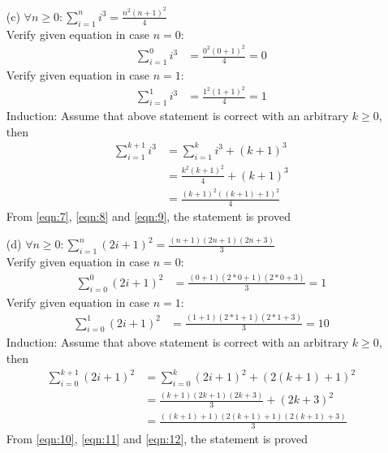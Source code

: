 \begin{enumerate}
    \newpage
    \item[(c)] $\forall n\geq 0: \displaystyle\sum^{n}_{i=1} i^3 = \frac{n^2(n+1)^2}{4}$ \\
        Verify given equation in case $n=0$:
            \begin{align}
                \displaystyle\sum^{0}_{i=1} i^3 &= \frac{0^2(0+1)^2}{4} = 0 \label{eqn:7}
            \end{align}
        Verify given equation in case $n=1$:
            \begin{align}
                \displaystyle\sum^{1}_{i=1} i^3 &= \frac{1^2(1+1)^2}{4} = 1 \label{eqn:8}
            \end{align}
        Induction: Assume that above statement is correct with an arbitrary $k \geq 0$, then\\
        \begin{align}
            \displaystyle\sum^{k+1}_{i=1} i^3 &= \displaystyle\sum^{k}_{i=1} i^3 + (k+1)^3 \\
                                            &= \frac{k^2(k+1)^2}{4} + (k+1)^3 \\
                                            &= \frac{(k+1)^2((k+1)+1)^2}{4} \label{eqn:9}
        \end{align}
        From \ref{eqn:7}, \ref{eqn:8} and \ref{eqn:9}, the statement is proved
    
    \item[(d)] $\forall n\geq 0: \displaystyle\sum^{n}_{i=1} (2i+1)^2 = \frac{(n+1)(2n+1)(2n+3)}{3}$ \\
        Verify given equation in case $n=0$:
            \begin{align}
                \displaystyle\sum^{0}_{i=0} (2i+1)^2 &= \frac{(0+1)(2*0+1)(2*0+3)}{3} = 1 \label{eqn:10}
            \end{align}
        Verify given equation in case $n=1$:
            \begin{align}
                \displaystyle\sum^{1}_{i=0} (2i+1)^2 &= \frac{(1+1)(2*1+1)(2*1+3)}{3} = 10 \label{eqn:11}
            \end{align}
        Induction: Assume that above statement is correct with an arbitrary $k \geq 0$, then\\
        \begin{align}
            \displaystyle\sum^{k+1}_{i=0} (2i+1)^2 &= \displaystyle\sum^{k}_{i=0} (2i+1)^2 + (2(k+1)+1)^2 \\
                                            &= \frac{(k+1)(2k+1)(2k+3)}{3} + (2k+3)^2 \\
                                            &= \frac{((k+1)+1)(2(k+1)+1)(2(k+1)+3)}{3} \label{eqn:12}
        \end{align}
        From \ref{eqn:10}, \ref{eqn:11} and \ref{eqn:12}, the statement is proved


\end{enumerate}
